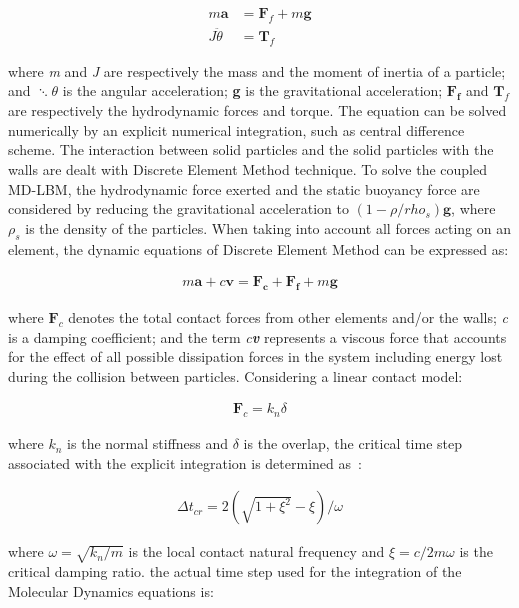 \begin{align}
\mathit{m}\mathbf{ a} & = \mathbf{F}_{f} + \mathit{m }\mathbf{g} \\
\mathit{J } \ddot{\theta} & = \mathbf{T}_{f}
\end{align}

where \textit{m} and \textit{J} are respectively the mass and the moment of 
inertia of a particle; and $\ddots{\theta}$ is the angular acceleration; 
\textbf{g} is the gravitational acceleration; $\mathbf{F_f}$ and 
$\mathbf{T}_{f}$ are respectively the hydrodynamic forces and torque. The 
equation can be solved numerically by an explicit numerical integration, such 
as central difference scheme. The interaction between solid particles and the 
solid particles with the walls are dealt with Discrete Element Method 
technique. To 
solve the coupled MD-LBM, the hydrodynamic force exerted and the static 
buoyancy force are considered by reducing the gravitational acceleration to 
$(1- \rho/rho_{s})\mathbf{g}$, where $\rho_{s}$ is the density of the 
particles. When taking into account all forces acting on an element, the 
dynamic equations of Discrete Element Method can be expressed as:

\begin{align}
\label{eq:mde}
\mathit{m}\mathbf{a} +\mathit{c}\mathbf{v} = \mathbf{F_c} + \mathbf{F_f} 
+\mathit{m}\mathbf{g}
\end{align} 

where $\mathbf{F}_{c}$ denotes the total contact forces from other elements 
and/or the walls; \textit{c} is a damping coefficient; and the term 
\textit{c\textbf{v}} represents a viscous force that accounts for the effect of 
all possible dissipation forces in the system including energy lost during the 
collision between particles. Considering a linear contact model:

\begin{align}
\mathbf{F}_{c}=\mathit{k}_{\mathit{n}} \delta
\end{align}

where $\mathit{k}_{\mathit{n}}$ is the normal stiffness and $\delta$ is the 
overlap, the critical time step associated with the explicit integration is 
determined as~\citep{He1997}:

\begin{align}
\Delta t_{\mathit{cr}}= 2(\sqrt{1 + \xi^{2}}-\xi) / \omega
\end{align}

where $\omega = \sqrt{\mathit{k}_{\mathit{n}}/\mathit{m}}$ is the local contact 
natural frequency and $\xi = \mathit{c}/2\mathit{m}\omega$ is the critical 
damping ratio. the actual time step used for the integration of the Molecular 
Dynamics equations is:


